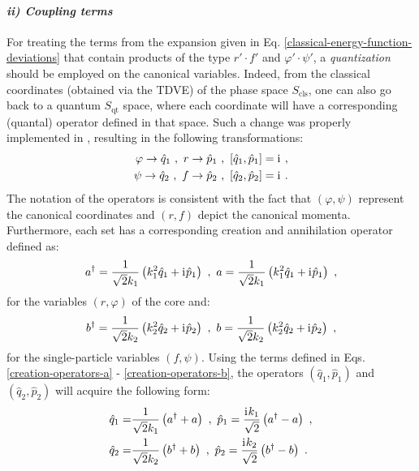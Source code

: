 \paragraph*{\textit{ii) Coupling terms}}
For treating the terms from the expansion given in Eq. \ref{classical-energy-function-deviations} that contain products of the type $r'\cdot f'$ and $\varphi'\cdot \psi'$, a \emph{quantization} should be employed on the canonical variables. Indeed, from the classical coordinates (obtained via the TDVE) of the phase space $S_\text{cls}$, one can also go back to a quantum $S_\text{qt}$ space, where each coordinate will have a corresponding (quantal) operator defined in that space. Such a change was properly implemented in \cite{raduta2020approach}, resulting in the following transformations:
\begin{align}
    \varphi\to\hat{q}_1\ ,\ r\to\hat{p}_1\ ,\ \left[\hat{q}_1,\hat{p}_1\right]&=\iu\ ,\nonumber\\
    \psi\to\hat{q}_2\ ,\ f\to\hat{p}_2\ ,\ \left[\hat{q}_2,\hat{p}_2\right]&=\iu\ .
    \label{canonical-coordinates-quantized}
\end{align}
The notation of the operators is consistent with the fact that $(\varphi,\psi)$ represent the canonical coordinates and $(r,f)$ depict the canonical momenta. Furthermore, each set has a corresponding creation and annihilation operator defined as:
\begin{align}
    a^\dagger=\frac{1}{\sqrt{2}k_1}\left(k_1^2\hat{q}_1+ \mathrm{i}\mkern1mu \hat{p}_1\right)\ ,\ a=\frac{1}{\sqrt{2}k_1}\left(k_1^2\hat{q}_1+ \mathrm{i}\mkern1mu \hat{p}_1\right)\ ,
    \label{creation-operators-a}
\end{align}
for the variables $(r,\varphi)$ of the core and:
\begin{align}
    b^\dagger=\frac{1}{\sqrt{2}k_2}\left(k_2^2\hat{q}_2+ \mathrm{i}\mkern1mu \hat{p}_2\right)\ ,\ b=\frac{1}{\sqrt{2}k_2}\left(k_2^2\hat{q}_2+ \mathrm{i}\mkern1mu \hat{p}_2\right)\ ,
    \label{creation-operators-b}
\end{align}
for the single-particle variables $(f,\psi)$. Using the terms defined in Eqs. \ref{creation-operators-a} - \ref{creation-operators-b}, the operators $(\hat{q}_1,\hat{p}_1)$ and $(\hat{q}_2,\hat{p}_2)$ will acquire the following form:
\begin{align}
    \hat{q}_1=&\frac{1}{\sqrt{2}k_1}\left(a^\dagger+a\right)\ ,\ \hat{p}_1=\frac{\iu k_1}{\sqrt{2}}\left(a^\dagger-a\right)\ ,\nonumber\\
    \hat{q}_2=&\frac{1}{\sqrt{2}k_2}\left(b^\dagger+b\right)\ ,\ \hat{p}_2=\frac{\iu k_2}{\sqrt{2}}\left(b^\dagger-b\right)\ .
    \label{canonical-transformations-ab-qp}
\end{align}

